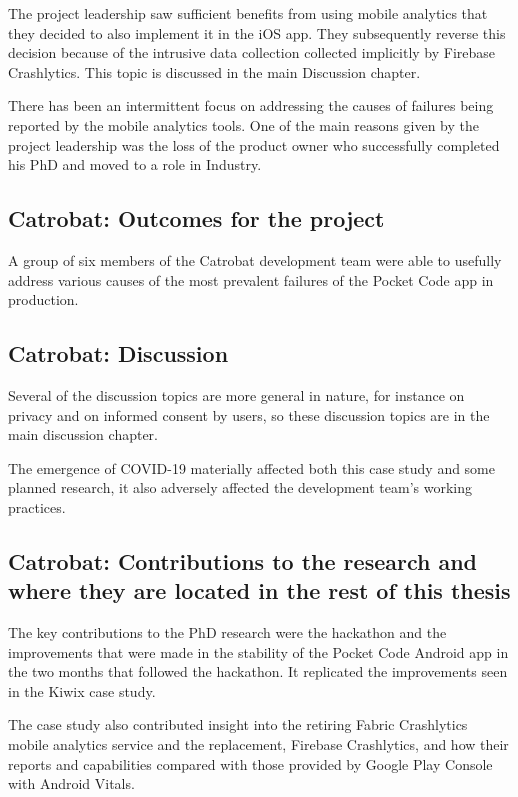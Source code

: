 The project leadership saw sufficient benefits from using mobile analytics that they decided to also implement it in the iOS app. They subsequently reverse this decision because of the intrusive data collection collected implicitly by Firebase Crashlytics. This topic is discussed in the main Discussion chapter.

There has been an intermittent focus on addressing the causes of failures being reported by the mobile analytics tools. One of the main reasons given by the project leadership was the loss of the product owner who successfully completed his PhD and moved to a role in Industry. 

\subsection{Catrobat: Outcomes for the project}
A group of six members of the Catrobat development team were able to usefully address various causes of the most prevalent failures of the Pocket Code app in production. 


\subsection{Catrobat: Discussion}

Several of the discussion topics are more general in nature, for instance on privacy and on informed consent by users, so these discussion topics are in the main discussion chapter.  

The emergence of COVID-19 materially affected both this case study and some planned research, it also adversely affected the development team's working practices.

\subsection{Catrobat: Contributions to the research and where they are located in the rest of this thesis}
The key contributions to the PhD research were the hackathon and the improvements that were made in the stability of the Pocket Code Android app in the two months that followed the hackathon. It replicated the improvements seen in the Kiwix case study. 

The case study also contributed insight into the retiring Fabric Crashlytics mobile analytics service and the replacement, Firebase Crashlytics, and how their reports and capabilities compared with those provided by Google Play Console with Android Vitals.


